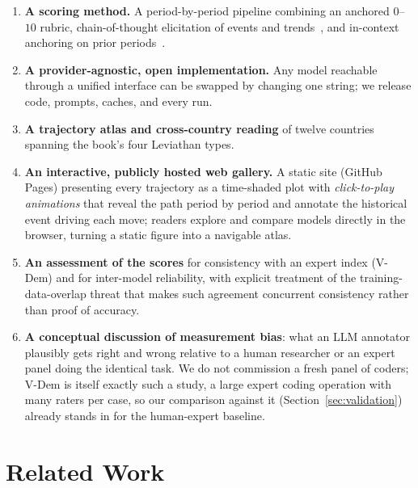 \documentclass[twocolumn,10pt]{article}
\begin{document}
\begin{enumerate}
  \item \textbf{A scoring method.} A period-by-period pipeline combining an
        anchored $0$--$10$ rubric, chain-of-thought elicitation of events and
        trends~\citep{wei2022chain}, and in-context anchoring on prior
        periods~\citep{brown2020language,dong2024survey}.
  \item \textbf{A provider-agnostic, open implementation.} Any model reachable
        through a unified interface can be swapped by changing one string; we
        release code, prompts, caches, and every run.
  \item \textbf{A trajectory atlas and cross-country reading} of twelve countries
        spanning the book's four Leviathan types.
  \item \textbf{An interactive, publicly hosted web gallery.} A static site
        (GitHub Pages) presenting every trajectory as a time-shaded plot with
        \emph{click-to-play animations} that reveal the path period by period
        and annotate the historical event driving each move; readers explore and
        compare models directly in the browser, turning a static figure into a
        navigable atlas.
  \item \textbf{An assessment of the scores} for consistency with an expert
        index (V-Dem) and for inter-model reliability, with explicit treatment of
        the training-data-overlap threat that makes such agreement concurrent
        consistency rather than proof of accuracy.
  \item \textbf{A conceptual discussion of measurement bias}: what an LLM
        annotator plausibly gets right and wrong relative to a human researcher
        or an expert panel doing the identical task. We do not commission a fresh
        panel of coders; V-Dem is itself exactly such a study, a large expert
        coding operation with many raters per case, so our comparison against it
        (Section~\ref{sec:validation}) already stands in for the human-expert
        baseline.
\end{enumerate}

\section{Related Work}
\label{sec:related}
\end{document}
